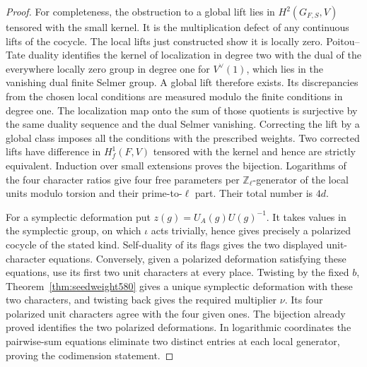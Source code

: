 \documentclass[a4paper,11pt]{article}
\theoremstyle{definition}
\theoremstyle{remark}
\newcommand{\ZZ}{\mathbb Z}\newcommand{\ord}{\operatorname{ord}}
\numberwithin{equation}{section}
\begin{document}
\begin{proof}
For completeness, the obstruction to a global lift lies in
\(H^2(G_{F,S},V)\) tensored with the small kernel. It is the
multiplication defect of any continuous lifts of the cocycle.
The local lifts just constructed show it is locally zero.
Poitou--Tate duality identifies the kernel of localization in
degree two with the dual of the everywhere locally zero group
in degree one for \(V^\vee(1)\), which lies in the vanishing
dual finite Selmer group. A global lift therefore exists.
Its discrepancies from the chosen local conditions are measured
modulo the finite conditions in degree one. The localization map
onto the sum of those quotients is surjective by the same duality
sequence and the dual Selmer vanishing. Correcting the lift by
a global class imposes all the conditions with the prescribed
weights. Two corrected lifts have difference in \(H^1_f(F,V)\)
tensored with the kernel and hence are strictly equivalent.
Induction over small extensions proves the bijection. Logarithms
of the four character ratios give four free parameters per
\(\ZZ_\ell\)-generator of the local units modulo torsion and
their prime-to-\(\ell\) part. Their total number is \(4d\).

For a symplectic deformation put \(z(g)=U_A(g)U(g)^{-1}\).
It takes values in the symplectic group, on which \(\iota\)
acts trivially, hence gives precisely a polarized cocycle
of the stated kind. Self-duality of its flags gives the two
displayed unit-character equations. Conversely, given a
polarized deformation satisfying these equations, use its
first two unit characters at every place. Twisting by the
fixed \(b\), Theorem~\ref{thm:seedweight580} gives a unique
symplectic deformation with these two characters, and twisting
back gives the required multiplier \(\nu\). Its four polarized
unit characters agree with the four given ones. The bijection
already proved identifies the two polarized deformations.
In logarithmic coordinates the pairwise-sum equations eliminate
two distinct entries at each local generator, proving the
codimension statement.
\end{proof}
\end{document}
